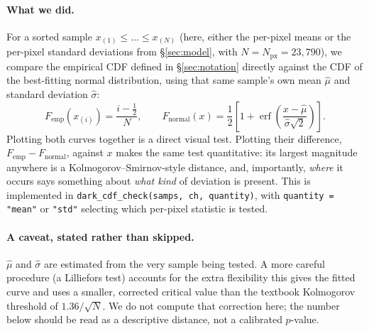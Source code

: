 \documentclass[11pt,a4paper]{article}
\newcommand{\code}[1]{\texttt{#1}}
\newcommand{\erf}{\operatorname{erf}}
\begin{document}
\paragraph{What we did.}
For a sorted sample $x_{(1)} \le \dots \le x_{(N)}$ (here, either the
per-pixel means or the per-pixel standard deviations from
\S\ref{sec:model}, with $N = N_{\mathrm{px}} = 23{,}790$), we compare the
empirical CDF defined in \S\ref{sec:notation} directly against the CDF of
the best-fitting normal distribution, using that same sample's own mean
$\hat\mu$ and standard deviation $\hat\sigma$:
\[
F_{\mathrm{emp}}(x_{(i)}) = \frac{i - \tfrac12}{N}, \qquad
F_{\mathrm{normal}}(x) = \frac12\left[1 + \erf\!\left(
\frac{x - \hat\mu}{\hat\sigma\sqrt2}\right)\right].
\]
Plotting both curves together is a direct visual test. Plotting their
difference, $F_{\mathrm{emp}} - F_{\mathrm{normal}}$, against $x$ makes the
same test quantitative: its largest magnitude anywhere is a
Kolmogorov--Smirnov-style distance, and, importantly, \emph{where} it
occurs says something about \emph{what kind} of deviation is present. This
is implemented in \code{dark\_cdf\_check(samps, ch, quantity)}, with
\code{quantity = "mean"} or \code{"std"} selecting which per-pixel
statistic is tested.

\paragraph{A caveat, stated rather than skipped.}
$\hat\mu$ and $\hat\sigma$ are estimated from the very sample being tested.
A more careful procedure (a Lilliefors test) accounts for the extra
flexibility this gives the fitted curve and uses a smaller, corrected
critical value than the textbook Kolmogorov threshold of
$1.36/\sqrt{N}$. We do not compute that correction here; the number below
should be read as a descriptive distance, not a calibrated $p$-value.
\end{document}

